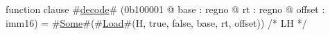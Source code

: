 function clause #\hyperref[zdecode]{decode}# (0b100001 @ base : regno @ rt : regno @ offset : imm16) =
  #\hyperref[zSome]{Some}#(#\hyperref[zLoad]{Load}#(H, true,  false, base, rt, offset)) /* LH */
